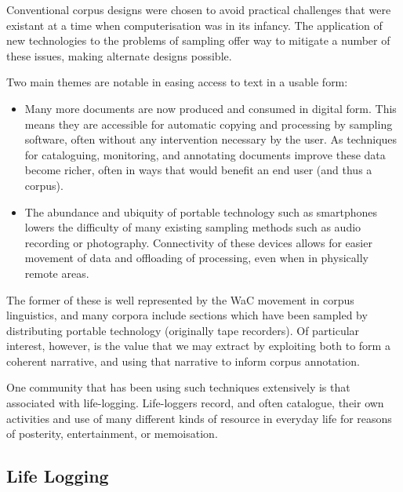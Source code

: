 Conventional corpus designs were chosen to avoid practical challenges that were existant at a time when computerisation was in its infancy.  The application of new technologies to the problems of sampling offer way to mitigate a number of these issues, making alternate designs possible.

Two main themes are notable in easing access to text in a usable form:

\begin{itemize}
    \item Many more documents are now produced and consumed in digital form.  This means they are accessible for automatic copying and processing by sampling software, often without any intervention necessary by the user.  As techniques for cataloguing, monitoring, and annotating documents improve these data become richer, often in ways that would benefit an end user (and thus a corpus).
    \item The abundance and ubiquity of portable technology such as smartphones lowers the difficulty of many existing sampling methods such as audio recording or photography.  Connectivity of these devices allows for easier movement of data and offloading of processing, even when in physically remote areas.
\end{itemize}


The former of these is well represented by the WaC movement in corpus linguistics, and many corpora include sections which have been sampled by distributing portable technology (originally tape recorders).  Of particular interest, however, is the value that we may extract by exploiting both to form a coherent narrative, and using that narrative to inform corpus annotation.

One community that has been using such techniques extensively is that associated with life-logging.  Life-loggers record, and often catalogue, their own activities and use of many different kinds of resource in everyday life for reasons of posterity, entertainment, or memoisation.










\subsection{Life Logging}

